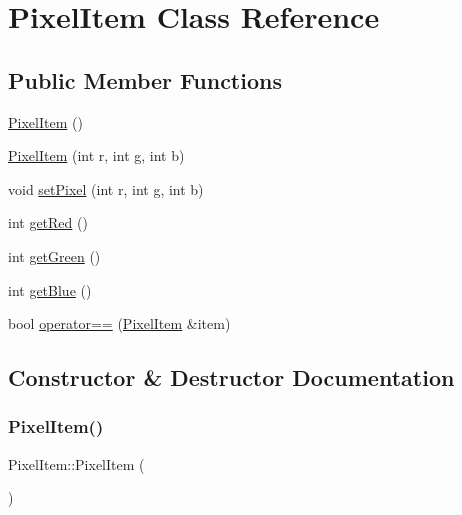 \hypertarget{class_pixel_item}{}\section{Pixel\+Item Class Reference}
\label{class_pixel_item}
\subsection*{Public Member Functions}
\begin{DoxyCompactItemize}
\item 
\hyperlink{class_pixel_item_afbb994c55d891cc0557e213c82263b54}{Pixel\+Item} ()
\item 
\hyperlink{class_pixel_item_a30a86eed2bb2bf489da77a6b193488a3}{Pixel\+Item} (int r, int g, int b)
\item 
void \hyperlink{class_pixel_item_a7d818b08859e2fbf8c0bd1741e853e2a}{set\+Pixel} (int r, int g, int b)
\item 
int \hyperlink{class_pixel_item_a0e41732aa80899aa090d4393434082f0}{get\+Red} ()
\item 
int \hyperlink{class_pixel_item_af27ddba28beb8398433751366dd00fe6}{get\+Green} ()
\item 
int \hyperlink{class_pixel_item_a5494bd00a58a69b4f36eaaa4048b488a}{get\+Blue} ()
\item 
bool \hyperlink{class_pixel_item_a8d15364c83253dabf97324e82151f8cb}{operator==} (\hyperlink{class_pixel_item}{Pixel\+Item} \&item)
\end{DoxyCompactItemize}


\subsection{Constructor \& Destructor Documentation}
\mbox{\label{class_pixel_item_afbb994c55d891cc0557e213c82263b54}} 
\subsubsection{\texorpdfstring{Pixel\+Item()}{PixelItem()}\hspace{0.1cm}{\footnotesize\ttfamily [1/2]}}
{\footnotesize\ttfamily Pixel\+Item\+::\+Pixel\+Item (\begin{DoxyParamCaption}{ }\end{DoxyParamCaption})}

